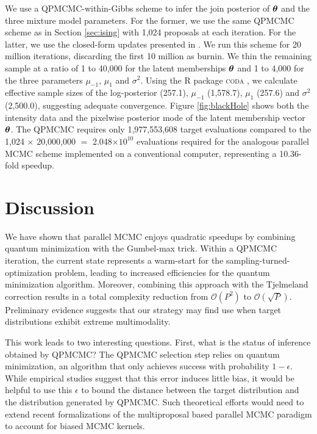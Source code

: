 \documentclass[12pt]{article} %
\begin{document}
We use a QPMCMC-within-Gibbs scheme to infer the join posterior of $\boldsymbol{\theta}$ and the three mixture model parameters.  For the former, we use the same QPMCMC scheme as in Section \ref{sec:ising} with 1,024 proposals at each iteration. For the latter, we use the closed-form updates presented in \citet{hurn1997difficulties}.  We run this scheme for 20 million iterations, discarding the first 10 million as burnin.  We thin the remaining sample at a ratio of 1 to 40,000 for the latent memberships $\boldsymbol{\theta}$ and 1 to 4,000 for the three parameters $\mu_{-1}$, $\mu_1$ and $\sigma^2$.  Using the \textsc{R} package \textsc{coda} \citep{coda}, we calculate effective sample sizes of the log-posterior (257.1), $\mu_{-1}$ (1,578.7), $\mu_1$ (257.6) and $\sigma^2$ (2,500.0), suggesting adequate convergence.   Figure \ref{fig:blackHole} shows both the intensity data and the pixelwise posterior mode of the latent membership vector $\boldsymbol{\theta}$.  The QPMCMC requires only 1,977,553,608 target evaluations compared to the 1,024 $\times$ 20,000,000 $=$ 2.048$\times10^{10}$ evaluations required for the analogous parallel MCMC scheme implemented on a conventional computer, representing a 10.36-fold speedup.

\section{Discussion}

We have shown that parallel MCMC enjoys quadratic speedups by combining quantum minimization with the Gumbel-max trick.  Within a QPMCMC iteration, the current state represents a warm-start for the sampling-turned-optimization problem, leading to increased efficiencies for the quantum minimization algorithm.   Moreover, combining this approach with the Tjelmeland correction \citep{holbrook2021generating} results in a total complexity reduction from $\mathcal{O}(P^2)$ to $\mathcal{O}(\sqrt{P})$.  Preliminary evidence suggests that our strategy may find use when target distributions exhibit extreme multimodality.  

This work leads to two interesting questions.   First, what is the status of inference obtained by QPMCMC?  The QPMCMC selection step relies on quantum minimization, an algorithm that only achieves success with probability $1-\epsilon$.  While empirical studies suggest that this error induces little bias, it would be helpful to use this $\epsilon$ to bound the distance between the target distribution and the distribution generated by QPMCMC.  Such theoretical efforts would need to extend recent formalizations of the multiproposal based parallel MCMC paradigm \citep{glatt} to account for biased MCMC kernels.
\end{document}

